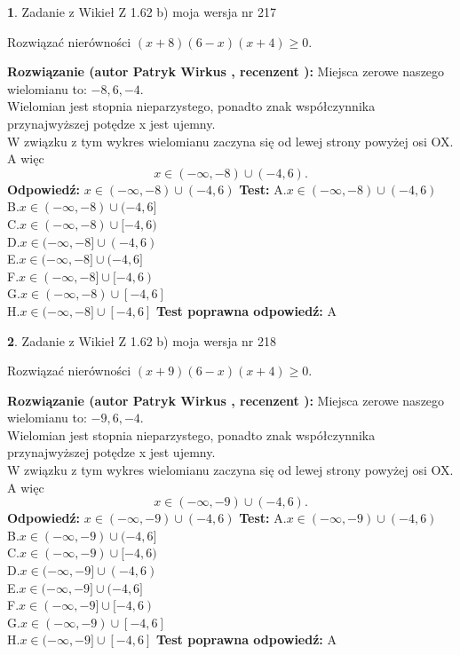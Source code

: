 \documentclass[12pt, a4paper]{article}
\theoremstyle{definition} %
\newtheorem{zad}{}
\newcommand{\zadStart}[1]{\begin{zad}#1\newline}
\newcommand{\zadStop}{\end{zad}}
\newcommand{\rozwStart}[2]{\noindent \textbf{Rozwiązanie (autor #1 , recenzent #2): }\newline}
\newcommand{\rozwStop}{\newline}
\newcommand{\odpStart}{\noindent \textbf{Odpowiedź:}\newline}
\newcommand{\odpStop}{\newline}
\newcommand{\testStart}{\noindent \textbf{Test:}\newline}
\newcommand{\testStop}{\newline}
\newcommand{\kluczStart}{\noindent \textbf{Test poprawna odpowiedź:}\newline}
\newcommand{\kluczStop}{\newline}
\begin{document}
\zadStart{Zadanie z Wikieł Z 1.62 b) moja wersja nr 217}

Rozwiązać nierówności $(x+8)(6-x)(x+4)\ge0$.
\zadStop
\rozwStart{Patryk Wirkus}{}
Miejsca zerowe naszego wielomianu to: $-8, 6, -4$.\\
Wielomian jest stopnia nieparzystego, ponadto znak współczynnika przy\linebreak najwyższej potędze x jest ujemny.\\ W związku z tym wykres wielomianu zaczyna się od lewej strony powyżej osi OX. A więc $$x \in (-\infty,-8) \cup (-4,6).$$
\rozwStop
\odpStart
$x \in (-\infty,-8) \cup (-4,6)$
\odpStop
\testStart
A.$x \in (-\infty,-8) \cup (-4,6)$\\
B.$x \in (-\infty,-8) \cup (-4,6]$\\
C.$x \in (-\infty,-8) \cup [-4,6)$\\
D.$x \in (-\infty,-8] \cup (-4,6)$\\
E.$x \in (-\infty,-8] \cup (-4,6]$\\
F.$x \in (-\infty,-8] \cup [-4,6)$\\
G.$x \in (-\infty,-8) \cup [-4,6]$\\
H.$x \in (-\infty,-8] \cup [-4,6]$
\testStop
\kluczStart
A
\kluczStop



\zadStart{Zadanie z Wikieł Z 1.62 b) moja wersja nr 218}

Rozwiązać nierówności $(x+9)(6-x)(x+4)\ge0$.
\zadStop
\rozwStart{Patryk Wirkus}{}
Miejsca zerowe naszego wielomianu to: $-9, 6, -4$.\\
Wielomian jest stopnia nieparzystego, ponadto znak współczynnika przy\linebreak najwyższej potędze x jest ujemny.\\ W związku z tym wykres wielomianu zaczyna się od lewej strony powyżej osi OX. A więc $$x \in (-\infty,-9) \cup (-4,6).$$
\rozwStop
\odpStart
$x \in (-\infty,-9) \cup (-4,6)$
\odpStop
\testStart
A.$x \in (-\infty,-9) \cup (-4,6)$\\
B.$x \in (-\infty,-9) \cup (-4,6]$\\
C.$x \in (-\infty,-9) \cup [-4,6)$\\
D.$x \in (-\infty,-9] \cup (-4,6)$\\
E.$x \in (-\infty,-9] \cup (-4,6]$\\
F.$x \in (-\infty,-9] \cup [-4,6)$\\
G.$x \in (-\infty,-9) \cup [-4,6]$\\
H.$x \in (-\infty,-9] \cup [-4,6]$
\testStop
\kluczStart
A
\kluczStop
\end{document}
